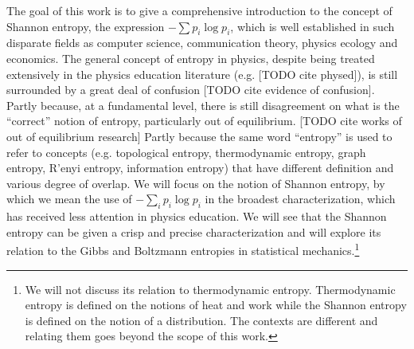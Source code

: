 \documentclass[iopart]{revtex4-1}
\begin{document}
The goal of this work is to give a comprehensive introduction to the concept of Shannon entropy, the expression $-\sum p_i \log p_i$, which is well established in such disparate fields as computer science, communication theory, physics\cite{Jaynes1957-1, Grandy} ecology and economics. The general concept of entropy in physics, despite being treated extensively in the physics education literature (e.g. [TODO cite physed]), is still surrounded by a great deal of confusion [TODO cite evidence of confusion]\cite{Swendsen, KishFerry}. Partly because, at a fundamental level, there is still disagreement on what is the ``correct'' notion of entropy, particularly out of equilibrium. [TODO cite works of out of equilibrium research] Partly because the same word ``entropy'' is used to refer to concepts (e.g. topological entropy, thermodynamic entropy, graph entropy, R'{e}nyi entropy, information entropy) that have different definition and various degree of overlap.  We will focus on the notion of Shannon entropy, by which we mean the use of $- \sum_i p_i \log p_i$ in the broadest characterization, which has received less attention in physics education. We will see that the Shannon entropy can be given a crisp and precise characterization and will explore its relation to the Gibbs and Boltzmann entropies in statistical mechanics.\footnote{We will not discuss its relation to thermodynamic entropy. Thermodynamic entropy is defined on the notions of heat and work while the Shannon entropy is defined on the notion of a distribution. The contexts are different and relating them goes beyond the scope of this work. }
\end{document}
